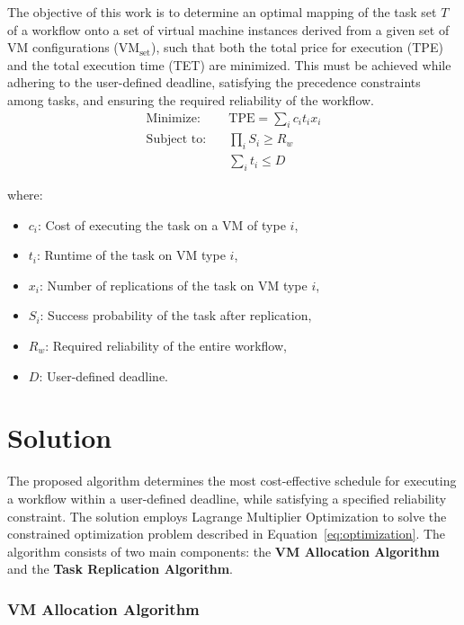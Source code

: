 \documentclass[12pt]{tcc}
\begin{document}
    The objective of this work is to determine an optimal mapping of the task set \( T \) of a workflow onto a set of virtual machine instances derived from a given set of VM configurations (\( \text{VM}_{\text{set}} \)), such that both the total price for execution (TPE) and the total execution time (TET) are minimized. This must be achieved while adhering to the user-defined deadline, satisfying the precedence constraints among tasks, and ensuring the required reliability of the workflow.
\begin{equation}
\begin{aligned}
\text{Minimize:} \quad & \text{TPE} = \sum_i c_i t_i x_i \\
\text{Subject to:} \quad & \prod_i S_i \geq R_w \\
& \sum_i t_i \leq D
\end{aligned}
\label{eq:optimization}
\end{equation}

\noindent
where:
\begin{itemize}
    \item \( c_i \): Cost of executing the task on a VM of type \( i \),
    \item \( t_i \): Runtime of the task on VM type \( i \),
    \item \( x_i \): Number of replications of the task on VM type \( i \),
    \item \( S_i \): Success probability of the task after replication,
    \item \( R_w \): Required reliability of the entire workflow,
    \item \( D \): User-defined deadline.
\end{itemize}

	
	
	\chapter{Solution}
	\label{sec_solution}
	
	The proposed algorithm determines the most cost-effective schedule for executing a workflow within a user-defined deadline, while satisfying a specified reliability constraint. The solution employs Lagrange Multiplier Optimization to solve the constrained optimization problem described in Equation~\eqref{eq:optimization}. The algorithm consists of two main components: the \textbf{VM Allocation Algorithm} and the \textbf{Task Replication Algorithm}.

\subsection*{VM Allocation Algorithm}
\end{document}
